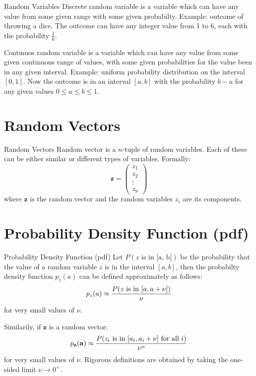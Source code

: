 \documentclass{beamer}
\begin{document}
\begin{frame}{Random Variables}
 Discrete random variable is a variable which can have any value from some given
 range with some given probabilty. Example: outcome of throwing a dice. The outcome
 can have any integer value from 1 to 6, each with the probability $\frac{1}{6}$.

 Continuos random variable is a variable which can have any value from some given
 continuous range of values, with some given probabilities for the value been in
 any given interval. Example: uniform probability distribution on the interval
 $[0, 1]$. Now the outcome is in an interval $[a, b]$ with the probability $b-a$
 for any given values $0 \le a \le b \le 1$.
\end{frame}

\section{Random Vectors}

\begin{frame}{Random Vectors}
  Random vector is a $n$-tuple of random variables. Each of these can be either
  similar or different types of variables. Formally:
  \[ \mathbf{z} =  \begin{pmatrix} z_1 \\ z_2 \\ \vdots \\ z_n \end{pmatrix} \]
  where $\mathbf{z}$ is the random vector and the random variables $z_i$ are
  its components.
\end{frame}

\section{Probability Density Function (pdf)}

\begin{frame}{Probability Density Function (pdf)}
  Let $P(\text{$z$ is in [a, b]})$ be the probability that the value of a
  random variable $z$ is in the interval $[a, b]$, then the probabilty density
  function $p_z(a)$ can be defined approximately as follows:
  \[ p_z(a) \approx \frac{P(\textnormal{$z$ is in $[a, a + \nu]$})}{\nu}\]
  for very small values of $\nu$.

  Similarily, if $\mathbf{z}$ is a random vector:
  \[ p_{\mathbf{z}}(\mathbf{a}) \approx
  \frac{P(\textnormal{$z_i$ is in $[a_i, a_i + \nu]$ for all $i$})}{\nu^n}\]
  for very small values of $\nu$. Rigorous definitions are obtained by taking
  the one-sided limit $\nu \to 0^+$.
\end{frame}
\end{document}
